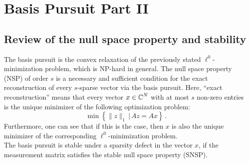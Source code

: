 \documentclass[a4paper]{article}
\begin{document}
\section*{Basis Pursuit Part II}

\subsection*{Review of the null space property and stability}
The basis pursuit is the convex relaxation of the previously stated \(\ell^0\)-minimization problem, which is NP-hard in general.
The null space property (NSP) of order \(s\) is a necessary and sufficient condition for the exact reconstruction of every \(s\)-sparse vector via the basis pursuit. Here, \enquote{exact reconstruction} means that every vector \(x\in\operatorname{\mathbb C}^N\) with at most \(s\) non-zero entries is the unique minimizer of the following optimization problem:
\[
    \min\left\{\|z\|_1\,|\,
    Az=Ax\right\}\,.\]
 Furthermore, one can see that if this is the case, then \(x\) is also the unique minimizer of the corresponding \(\ell^0\)-minimization problem.\\
 The basis pursuit is stable under a sparsity defect in the vector \(x\), if the measurement matrix satisfies the stable null space property (SNSP).
\end{document}

